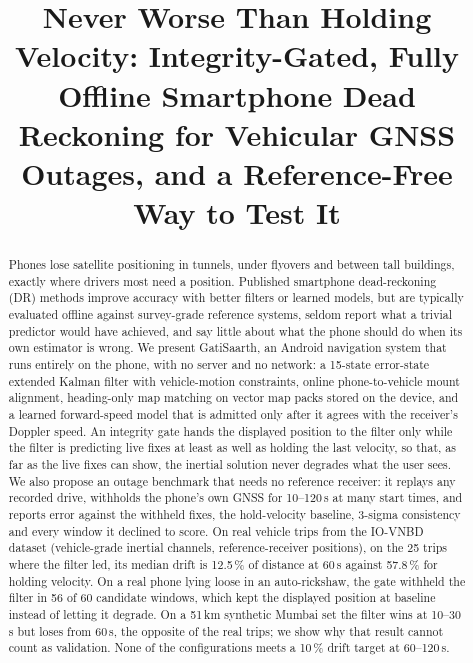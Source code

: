 \documentclass[conference]{IEEEtran}
\newcommand{\todo}[1]{\textcolor{red}{[TODO: #1]}}
\begin{document}
\title{Never Worse Than Holding Velocity: Integrity-Gated, Fully Offline Smartphone Dead Reckoning for Vehicular GNSS Outages, and a Reference-Free Way to Test It}

\author{\IEEEauthorblockN{\todo{Author 1}, \todo{Author 2}, \todo{Author 3}}
\IEEEauthorblockA{\todo{Department, Institution, City, India}\\
\todo{email addresses}}}

\maketitle

\begin{abstract}
Phones lose satellite positioning in tunnels, under flyovers and between tall
buildings, exactly where drivers most need a position. Published smartphone
dead-reckoning (DR) methods improve accuracy with better filters or learned
models, but are typically evaluated offline against survey-grade reference
systems, seldom report what a trivial predictor would have achieved, and say
little about what the phone should do when its own estimator is wrong. We present GatiSaarth, an
Android navigation system that runs entirely on the phone, with no server and
no network: a 15-state error-state extended Kalman filter with vehicle-motion
constraints, online phone-to-vehicle mount alignment, heading-only map matching
on vector map packs stored on the device, and a learned forward-speed model that
is admitted only after it agrees with the receiver's Doppler speed. An integrity
gate hands the displayed position to the filter only while the filter is
predicting live fixes at least as well as holding the last velocity, so that,
as far as the live fixes can show, the inertial solution never degrades what
the user sees. We also propose an outage
benchmark that needs no reference receiver: it replays any recorded drive, withholds
the phone's own GNSS for 10--120\,s at many start times, and reports error
against the withheld fixes, the hold-velocity baseline, 3-sigma consistency and
every window it declined to score. On real vehicle trips from the IO-VNBD
dataset (vehicle-grade inertial channels, reference-receiver positions), on the
25 trips where the filter led, its median drift is 12.5\,\% of distance at
60\,s against 57.8\,\% for holding velocity. On a real phone lying loose in an
auto-rickshaw, the gate withheld the filter in 56 of 60 candidate windows,
which kept the displayed position at baseline instead of letting it degrade.
On a 51\,km synthetic Mumbai set the filter wins at 10--30\,s but loses from
60\,s, the opposite of the real trips; we show why that result cannot count as
validation. None of the configurations meets a 10\,\% drift target at
60--120\,s.
\end{abstract}
\end{document}
